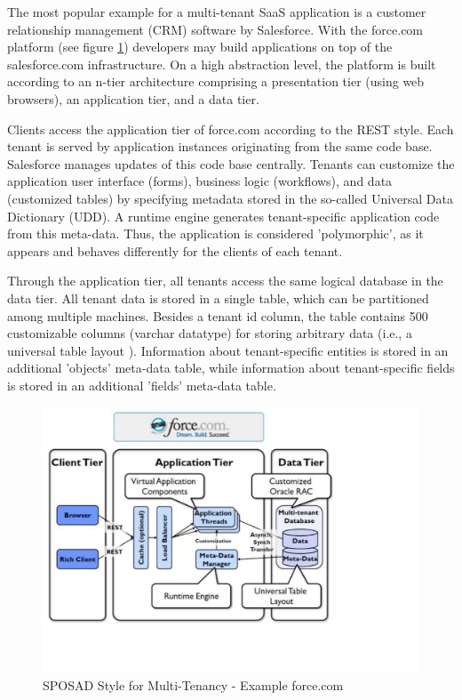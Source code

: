 The most popular example for a multi-tenant SaaS application is a customer relationship management (CRM) software by Salesforce. With the force.com platform (see figure \ref{fig:Multi-tenantApplicationDiagram-03}) developers may build applications on top of the salesforce.com infrastructure. On a high abstraction level, the platform is built according to an n-tier architecture \cite{Weissman:2009:DFM:1559845.1559942} comprising a presentation tier (using web browsers), an application tier, and a data tier.

Clients access the application tier of force.com according to the REST style. Each tenant is served by application instances originating from the same code base. Salesforce manages updates of this code base centrally. Tenants can customize the application user interface
(forms), business logic (workflows), and data (customized tables) by specifying metadata stored in the so-called Universal Data Dictionary (UDD). A runtime engine generates tenant-specific application code from this meta-data. Thus, the application is considered 'polymorphic', as it appears and behaves differently for the clients of each tenant.

Through the application tier, all tenants access the same logical database in the data tier. All tenant data is stored in a single table, which can be partitioned among multiple machines. Besides a tenant id column, the table contains 500 customizable columns (varchar
datatype) for storing arbitrary data (i.e., a universal table layout \cite{Aulbach:2008:MDS:1376616.1376736}). Information about tenant-specific entities is stored in an additional 'objects' meta-data table, while information about tenant-specific fields is stored in an additional 'fields' meta-data table.

\begin{figure}[h]
\centering
\includegraphics{patterns/Multi-tenantApplicationDiagram-03.pdf}
\caption{SPOSAD Style for Multi-Tenancy - Example force.com}
\label{fig:Multi-tenantApplicationDiagram-03}
\end{figure}


